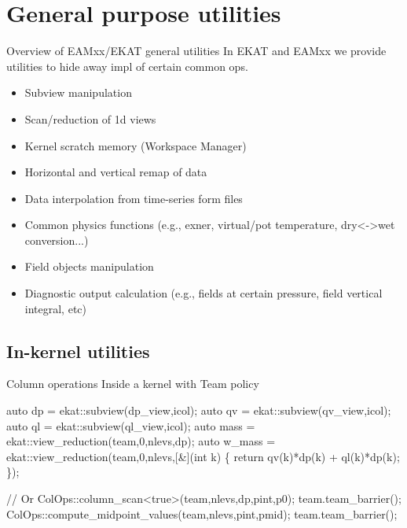 \documentclass[8pt,NM,theme=angles,number=2023-00000]{sandia-beamer}
\begin{document}
\section{General purpose utilities}
\begin{frame}{Overview of EAMxx/EKAT general utilities}
  In EKAT and EAMxx we provide utilities to hide away impl of certain common ops.
  \begin{itemize}
    \item Subview manipulation
    \item Scan/reduction of 1d views
    \item Kernel scratch memory (Workspace Manager)
    \item Horizontal and vertical remap of data
    \item Data interpolation from time-series form files
    \item Common physics functions (e.g., exner, virtual/pot temperature, dry<->wet conversion...)
    \item Field objects manipulation
    \item Diagnostic output calculation (e.g., fields at certain pressure, field vertical integral, etc)
  \end{itemize}
\end{frame}

\subsection{In-kernel utilities}
\begin{frame}[fragile]{Column operations}
  Inside a kernel with Team policy
  \begin{semiverbatim} \small
      auto dp = ekat::subview(dp\_view,icol);
      auto qv = ekat::subview(qv\_view,icol);
      auto ql = ekat::subview(ql\_view,icol);
      auto mass = ekat::view\_reduction(team,0,nlevs,dp);
      auto w\_mass = ekat::view\_reduction(team,0,nlevs,[&](int k) \{
        return qv(k)*dp(k) + ql(k)*dp(k);
      \});

      // Or
      ColOps::column\_scan<true>(team,nlevs,dp,pint,p0);
      team.team\_barrier();
      ColOps::compute\_midpoint\_values(team,nlevs,pint,pmid);
      team.team\_barrier();
  \end{semiverbatim}
\end{frame}
\end{document}
